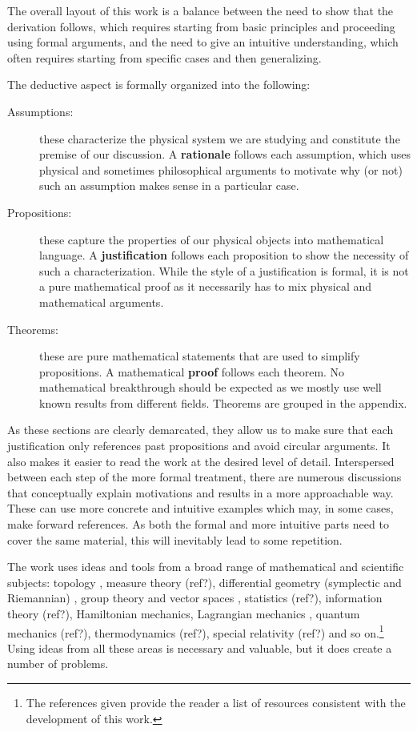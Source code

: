 \documentclass[smallextended]{svjour3}
\numberwithin{equation}{section}
\theoremstyle{definition}
\begin{document}
The overall layout of this work is a balance between the need to show that the derivation follows, which requires starting from basic principles and proceeding using formal arguments, and the need to give an intuitive understanding, which often requires starting from specific cases and then generalizing.

The deductive aspect is formally organized into the following:
\begin{description}
  \item[Assumptions:] these characterize the physical system we are studying and constitute the premise of our discussion. A \textbf{rationale} follows each assumption, which uses physical and sometimes philosophical arguments to motivate why (or not) such an assumption makes sense in a particular case.
  
  \item[Propositions:] these capture the properties of our physical objects into mathematical language. A \textbf{justification} follows each proposition to show the necessity of such a characterization. While the style of a justification is formal, it is not a pure mathematical proof as it necessarily has to mix physical and mathematical arguments.
  
  \item[Theorems:] these are pure mathematical statements that are used to simplify propositions. A mathematical \textbf{proof} follows each theorem. No mathematical breakthrough should be expected as we mostly use well known results from different fields. Theorems are grouped in the appendix.
\end{description}

As these sections are clearly demarcated, they allow us to make sure that each justification only references past propositions and avoid circular arguments. It also makes it easier to read the work at the desired level of detail. Interspersed between each step of the more formal treatment, there are numerous discussions that conceptually explain motivations and results in a more approachable way. These can use more concrete and intuitive examples which may, in some cases, make forward references. As both the formal and more intuitive parts need to cover the same material, this will inevitably lead to some repetition.

The work uses ideas and tools from a broad range of mathematical and scientific subjects: topology \cite{LeeTM}, measure theory (ref?), differential geometry (symplectic and Riemannian) \cite{Lee}, group theory and vector spaces \cite{Lang,Young}, statistics (ref?), information theory (ref?), Hamiltonian mechanics, Lagrangian mechanics \cite{classical_dynamics}, quantum mechanics (ref?), thermodynamics (ref?), special relativity (ref?) and so on.\footnote{The references given provide the reader a list of resources consistent with the development of this work.} Using ideas from all these areas is necessary and valuable, but it does create a number of problems.
\end{document}
